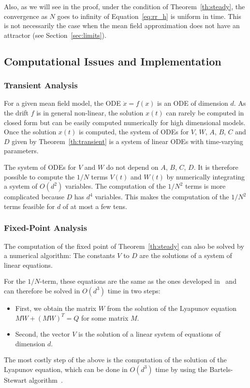\documentclass[sigconf]{acmart}
\begin{document}
Also, as we will see in the proof, under the condition of
Theorem~\ref{th:steady}, the convergence as $N$ goes to infinity of
Equation~\eqref{eq:rr_h} is uniform in time. This is not necessarily
the case when the mean field approximation does not have an attractor
(see Section~\ref{sec:limits}).

\subsection{Computational Issues and Implementation}
\label{ssec:numerical}

\subsubsection{Transient Analysis}

For a given mean field model, the ODE $\dot{x}=f(x)$ is an ODE of
dimension $d$. As the drift $f$ is in general non-linear, the solution
$x(t)$ can rarely be computed in closed form but can be easily
computed numerically for high dimensional models. Once the solution
$x(t)$ is computed, the system of ODEs for $V$, $W$, $A$, $B$, $C$ and
$D$ given by Theorem~\ref{th:transient} is a system of linear ODEs
with time-varying parameters.

The system of ODEs for $V$ and $W$ do not depend on $A$, $B$, $C$,
$D$. It is therefore possible to compute the $1/N$ terms $V(t)$ and
$W(t)$ by numerically integrating a system of $O(d^2)$ variables. The
computation of the $1/N^2$ terms is more complicated because  $D$ 
has $d^4$ variables. This makes the computation of the
$1/N^2$ terms feasible for $d$ of at most a few tens. 

\subsubsection{Fixed-Point Analysis}

The computation of the fixed point of Theorem~\ref{th:steady} can also
be solved by a numerical algorithm: The constants $V$ to $D$ are the
solutions of a system of linear equations.

For the $1/N$-term, these equations are the same as the ones
developed in~\cite{gast2017refined} and can therefore be solved in
$O(d^3)$ time in two steps:
\begin{itemize}
\item First, we obtain the matrix $W$ from the solution of the Lyapunov equation
  $MW + (MW)^T = Q$ for some matrix $M$.
\item Second, the vector $V$ is the solution of a linear system of
  equations of dimension $d$. 
\end{itemize}
The most costly step of the above is the computation of the
solution of the Lyapunov equation, which can be done in $O(d^3)$ time by
using the Bartels-Stewart algorithm~\cite{bartels1972solution}. 
\end{document}
